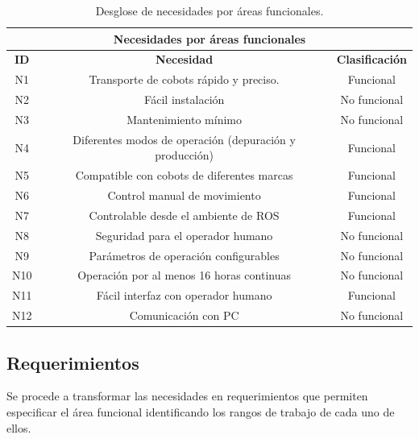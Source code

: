 \begin{table}[ht]
\begin{center}
\begin{tabular}{|c|c|c|}
\hline
\multicolumn{3}{|c|}{\textbf{Necesidades por áreas funcionales}}                               \\ \hline
\textbf{ID} & \textbf{Necesidad}                                      & \textbf{Clasificación} \\ \hline
N1          & Transporte de cobots rápido y preciso.                  & Funcional              \\ \hline
N2          & Fácil instalación                                       & No funcional           \\ \hline
N3          & Mantenimiento mínimo                                    & No funcional           \\ \hline
N4          & Diferentes modos de operación (depuración y producción) & Funcional              \\ \hline
N5          & Compatible con cobots de diferentes marcas              & Funcional              \\ \hline
N6          & Control manual de movimiento                            & Funcional              \\ \hline
N7          & Controlable desde el ambiente de ROS                    & Funcional              \\ \hline
N8          & Seguridad para el operador humano                       & No funcional           \\ \hline
N9          & Parámetros de operación configurables                   & No funcional           \\ \hline
N10         & Operación por al menos 16 horas continuas               & No funcional           \\ \hline
N11         & Fácil interfaz con operador humano                      & Funcional              \\ \hline
N12         & Comunicación con PC                                     & No funcional            \\ \hline
\end{tabular}
\caption{Desglose de necesidades por áreas funcionales.}
\label{tab:cuadro_af}
\end{center}
\end{table}
\newpage
\subsection{Requerimientos}
Se procede a transformar las necesidades en requerimientos que permiten especificar el área funcional identificando los rangos de trabajo de cada uno de ellos. 

